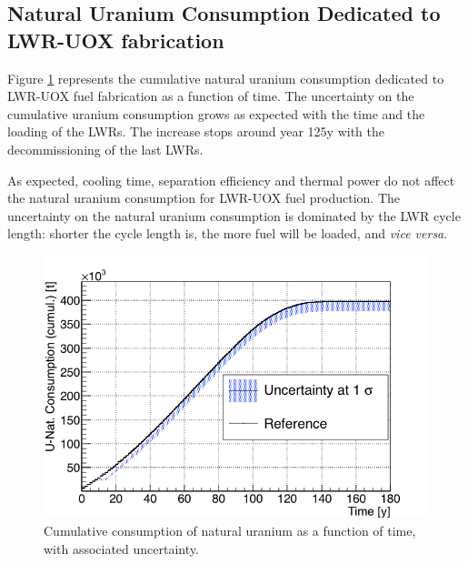 \documentclass{anstrans}
\begin{document}
\subsection{Natural Uranium Consumption Dedicated to \gls{LWR}-\gls{UOX} fabrication}

Figure \ref{fig:unat_full} represents the cumulative natural uranium consumption
dedicated to \gls{LWR}-\gls{UOX} fuel fabrication as a function of time.  The uncertainty on
the cumulative uranium consumption grows as expected with the time and the
loading of the \glspl{LWR}.  The increase stops around year 125y with the
decommissioning of the last \glspl{LWR}.

As expected, cooling time, separation efficiency and thermal power do not
affect the natural uranium consumption for \gls{LWR}-\gls{UOX} fuel production.  The uncertainty on the natural uranium
consumption is dominated by the \gls{LWR} cycle length: shorter the cycle
length is, the more fuel will be loaded, and \emph{vice versa}.


\begin{figure}[t] %
    \centering
    \includegraphics[scale=0.3]{unat_full}
    \caption{Cumulative consumption of natural uranium as a function of time, with
      associated uncertainty.}\label{fig:unat_full}
\end{figure}
\end{document}
